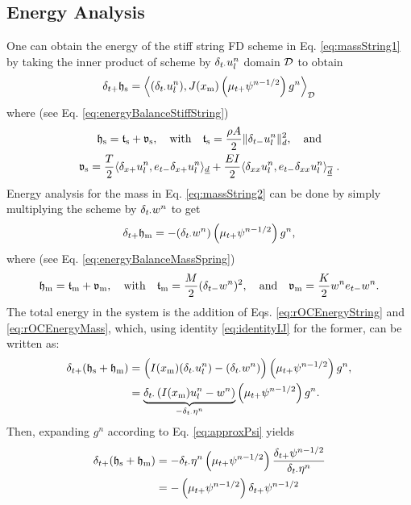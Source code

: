\subsection{Energy Analysis}
One can obtain the energy of the stiff string FD scheme in Eq. \eqref{eq:massString1} by taking the inner product of scheme by $\delta_{t\cdot} u_l^n$ domain $\mathcal{D}$ to obtain 
\begin{equation}\label{eq:rOCEnergyString}
    \delta_{t+} \mathfrak{h}_\text{s} = \left\langle (\delta_{t\cdot} u_l^n), J(x_\text{m})\left(\mu_{t+} \psi^{n-1/2}\right)g^n\right\rangle_{\mathcal{D}}
\end{equation}
where (see Eq. \eqref{eq:energyBalanceStiffString})
\begin{equation*}
    \begin{gathered}
        \mathfrak{h}_\text{s} = \mathfrak{t}_\text{s} + \mathfrak{v}_\text{s}, \quad \text{with} \quad \mathfrak{t}_\text{s} = \frac{\rho A}{2}\lVert\delta_{t-} u_l^n\rVert^2_d,\quad \text{and} \\
        \mathfrak{v}_\text{s} = \frac{T}{2}\langle\delta_{x+}u_l^n, e_{t-}\delta_{x+}u_l^n\rangle_{\underline{d}} + \frac{EI}{2}\langle\delta_{xx}u_l^n, e_{t-}\delta_{xx}u_l^n\rangle_{\overline{\underline{d}}}\ .
    \end{gathered}
\end{equation*}
Energy analysis for the mass in Eq. \eqref{eq:massString2} can be done by simply multiplying the scheme by $\delta_{t\cdot} w^n$ to get 
\begin{equation}\label{eq:rOCEnergyMass}
    \delta_{t+} \mathfrak{h}_\text{m} = -(\delta_{t\cdot} w^n)\left(\mu_{t+} \psi^{n-1/2}\right)g^n,
\end{equation}
where (see Eq. \eqref{eq:energyBalanceMassSpring})
\begin{equation*}
    \mathfrak{h}_\text{m} = \mathfrak{t}_\text{m} + \mathfrak{v}_\text{m}, \quad \text{with} \quad \mathfrak{t}_\text{m} = \frac{M}{2}(\delta_{t-} w^n)^2, \quad \text{and} \quad \mathfrak{v}_\text{m} = \frac{K}{2}w^n e_{t-}w^n.
\end{equation*}
The total energy in the system is the addition of Eqs. \eqref{eq:rOCEnergyString} and \eqref{eq:rOCEnergyMass}, which, using identity \eqref{eq:identityIJ} for the former, can be written as:
\begin{align*}
    \delta_{t+}(\mathfrak{h}_\text{s} + \mathfrak{h}_\text{m}) &= \Big(I(x_\text{m})(\delta_{t\cdot} u_l^n) - (\delta_{t\cdot} w^n)\Big)\left(\mu_{t+} \psi^{n-1/2}\right)g^n,\\
    &= \underbrace{\delta_{t\cdot}\left(I(x_\text{m})u_l^n - w^n\right)}_{-\delta_{t\cdot} \eta^n}\left(\mu_{t+} \psi^{n-1/2}\right)g^n.
\end{align*}
Then, expanding $g^n$ according to Eq. \eqref{eq:approxPsi} yields 
\begin{align*}
    \delta_{t+}(\mathfrak{h}_\text{s} + \mathfrak{h}_\text{m}) &= - \delta_{t\cdot}\eta^n\left(\mu_{t+} \psi^{n-1/2}\right)\frac{\delta_{t+}\psi^{n-1/2}}{\delta_{t\cdot}\eta^n}\\
    &= -\left(\mu_{t+} \psi^{n-1/2}\right)\delta_{t+}\psi^{n-1/2}
\end{align*}
